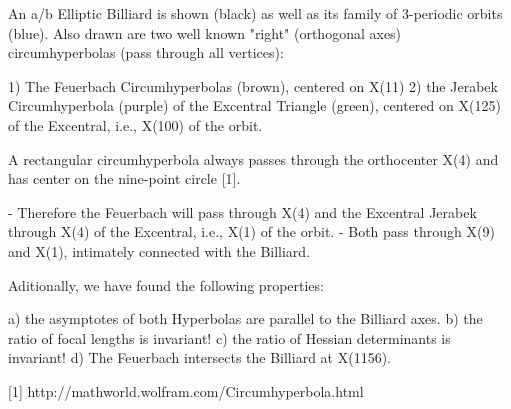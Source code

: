 An a/b Elliptic Billiard is shown (black) as well as its family of 3-periodic orbits (blue). Also drawn are two well known "right" (orthogonal axes) circumhyperbolas (pass through all vertices):

1) The Feuerbach Circumhyperbolas (brown), centered on X(11)
2) the Jerabek Circumhyperbola (purple) of the Excentral Triangle (green), centered on X(125) of the Excentral, i.e., X(100) of the orbit.

A rectangular circumhyperbola always passes through the orthocenter X(4) and has center on the nine-point circle [1].

- Therefore the Feuerbach will pass through X(4) and the Excentral Jerabek through X(4) of the Excentral, i.e., X(1) of the orbit.
- Both pass through X(9) and X(1), intimately connected with the Billiard.

Aditionally, we have found the following properties:

a) the asymptotes of both Hyperbolas are parallel to the Billiard axes.
b) the ratio of focal lengths is invariant!
c) the ratio of Hessian determinants is invariant!
d) The Feuerbach intersects the Billiard at X(1156).

[1] http://mathworld.wolfram.com/Circumhyperbola.html